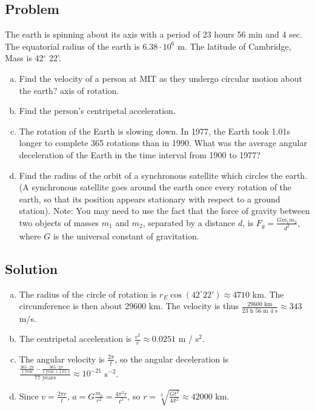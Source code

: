 \documentclass[solutions]{esg8012pset}
\begin{document}
\subsection*{Problem}
  The earth is spinning about its axis with a period of 23 hours 56 min and 4 sec. The equatorial radius of the earth is $6.38\cdot 10^{6}$ m. The latitude of Cambridge, Mass is 42$^{\circ}$ 22'.
  \begin{enumerate}[a)]
    \item Find the velocity of a person at MIT as they undergo circular motion about the earth? axis of rotation.
    \item Find the person's centripetal acceleration.
    \item The rotation of the Earth is slowing down. In 1977, the Earth took 1.01s longer to complete 365 rotations than in 1990. What was the average angular deceleration of the Earth in the time interval from 1900 to 1977?
    \item Find the radius of the orbit of a synchronous satellite which circles the earth. (A synchronous satellite goes around the earth once every rotation of the earth, so that its position appears stationary with respect to a ground station).  Note: You may need to use the fact that the force of gravity between two objects of masses $m_1$ and $m_2$, separated by a distance $d$, is $F_g = \frac{G m_1 m_2}{d^2}$, where $G$ is the universal constant of gravitation.
  \end{enumerate}
\subsection*{Solution}
  \begin{enumerate}[a)]
    \item The radius of the circle of rotation is $r_E \cos(42^{\circ} 22') \approx 4710$ km.  The circumference is then about 29600 km.  The velocity is thus $\frac{29600\text{ km}}{23\text{ h }56\text{ m }4\text{ s}} \approx 343$ m/s.
    \item The centripetal acceleration is $\frac{v^2}{r} \approx 0.0251$ m / s$^2$.
    \item The angular velocity is $\frac{2\pi}{t}$, so the angular deceleration is $\frac{\frac{365\cdot 2\pi}{1\text{ year}} - \frac{365\cdot 2\pi}{1\text{ year}+1.01\text{ s}}}{77\text{ years}} \approx 10^{-21}$ s$^{-2}$.
    \item Since $v = \frac{2\pi r}{t}$, $a = G\frac{m_e}{r^2} = \frac{4\pi^2 r}{t^2}$, so $r = \sqrt[3]{\frac{G t^2}{4\pi^2}} \approx 42000$ km.
  \end{enumerate}
\end{document}

